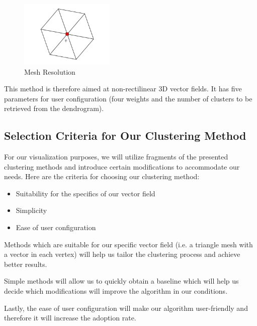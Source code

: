 \begin{figure}[h]
	\centering
	\includegraphics[width=0.4\textwidth]{./illustrations/mesh_resolution.pdf}
	\caption[Mesh Resolution]{Mesh Resolution}
	\label{fig:illustration-mesh_resolution}
\end{figure}

This method is therefore aimed at non-rectilinear 3D vector fields. It has five parameters for user configuration (four weights and the number of clusters to be retrieved from the dendrogram).
\subsection{Selection Criteria for Our Clustering Method}
\label{subsec:analysis-field_clustering-sel_criteria}

For our visualization purposes, we will utilize fragments of the presented clustering methods and introduce certain modifications to accommodate our needs. Here are the criteria for choosing our clustering method:

\begin{itemize}
\item Suitability for the specifics of our vector field
\item Simplicity
\item Ease of user configuration
\end{itemize}

Methods which are suitable for our specific vector field (i.e. a triangle mesh with a vector in each vertex) will help us tailor the clustering process and achieve better results. 

Simple methods will allow us to quickly obtain a baseline which will help us decide which modifications will improve the algorithm in our conditions. 

Lastly, the ease of user configuration will make our algorithm user-friendly and therefore it will increase the adoption rate.

